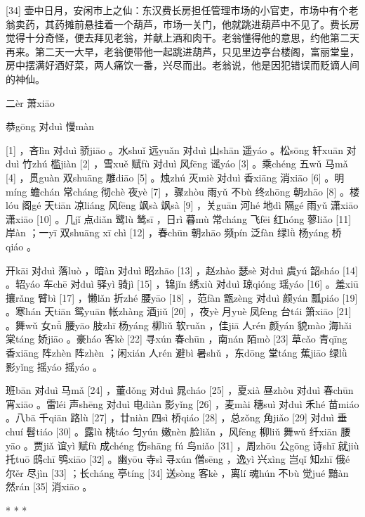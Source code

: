 \documentclass[12pt,UTF8]{ctexbook}
\begin{document}
[34] 壶中日月，安闲市上之仙：东汉费长房担任管理市场的小官吏，市场中有个老翁卖药，其药摊前悬挂着一个葫芦，市场一关门，他就跳进葫芦中不见了。费长房觉得十分奇怪，便去拜见老翁，并献上酒和肉干。老翁懂得他的意思，约他第二天再来。第二天一大早，老翁便带他一起跳进葫芦，只见里边亭台楼阁，富丽堂皇，房中摆满好酒好菜，两人痛饮一番，兴尽而出。老翁说，他是因犯错误而贬谪人间的神仙。





二èr 萧xiāo


恭gōng 对duì 慢màn





[1] ，吝lìn 对duì 骄jiāo 。水shuǐ 远yuǎn 对duì 山shān 遥yáo 。松sōng 轩xuān 对duì 竹zhú 槛jiàn [2] ，雪xuě 赋fù 对duì 风fēng 谣yáo [3] 。乘chéng 五wǔ 马mǎ [4] ，贯guàn 双shuāng 雕diāo [5] 。烛zhú 灭miè 对duì 香xiāng 消xiāo [6] 。明míng 蟾chán 常cháng 彻chè 夜yè [7] ，骤zhòu 雨yǔ 不bù 终zhōng 朝zhāo [8] 。楼lóu 阁gé 天tiān 凉liáng 风fēng 飒sà 飒sà [9] ，关guān 河hé 地dì 隔gé 雨yǔ 潇xiāo 潇xiāo [10] 。几jǐ 点diǎn 鹭lù 鸶sī ，日rì 暮mù 常cháng 飞fēi 红hóng 蓼liǎo [11] 岸àn ；一yī 双shuāng xī chì [12] ，春chūn 朝zhāo 频pín 泛fàn 绿lǜ 杨yáng 桥qiáo 。

开kāi 对duì 落luò ，暗àn 对duì 昭zhāo [13] ，赵zhào 瑟sè 对duì 虞yú 韶sháo [14] 。轺yáo 车chē 对duì 驿yì 骑jì [15] ，锦jǐn 绣xiù 对duì 琼qióng 瑶yáo [16] 。羞xiū 攘rǎng 臂bì [17] ，懒lǎn 折zhé 腰yāo [18] ，范fàn 甑zèng 对duì 颜yán 瓢piáo [19] 。寒hán 天tiān 鸳yuān 帐zhàng 酒jiǔ [20] ，夜yè 月yuè 凤fèng 台tái 箫xiāo [21] 。舞wǔ 女nǚ 腰yāo 肢zhī 杨yáng 柳liǔ 软ruǎn ，佳jiā 人rén 颜yán 貌mào 海hǎi 棠táng 娇jiāo 。豪háo 客kè [22] 寻xún 春chūn ，南nán 陌mò [23] 草cǎo 青qīng 香xiāng 阵zhèn 阵zhèn ；闲xián 人rén 避bì 暑shǔ ，东dōng 堂táng 蕉jiāo 绿lǜ 影yǐng 摇yáo 摇yáo 。

班bān 对duì 马mǎ [24] ，董dǒng 对duì 晁cháo [25] ，夏xià 昼zhòu 对duì 春chūn 宵xiāo 。雷léi 声shēng 对duì 电diàn 影yǐng [26] ，麦mài 穗suì 对duì 禾hé 苗miáo 。八bā 千qiān 路lù [27] ，廿niàn 四sì 桥qiáo [28] ，总zǒng 角jiǎo [29] 对duì 垂chuí 髫tiáo [30] 。露lù 桃táo 匀yún 嫩nèn 脸liǎn ，风fēng 柳liǔ 舞wǔ 纤xiān 腰yāo 。贾jiǎ 谊yì 赋fù 成chéng 伤shāng fú 鸟niǎo [31] ，周zhōu 公gōng 诗shī 就jiù 托tuō 鸱chī 鸮xiāo [32] 。幽yōu 寺sì 寻xún 僧sēng ，逸yì 兴xìng 岂qǐ 知zhī 俄é 尔ěr 尽jìn [33] ；长cháng 亭tíng [34] 送sòng 客kè ，离lí 魂hún 不bù 觉jué 黯àn 然rán [35] 消xiāo 。



* * *
\end{document}
